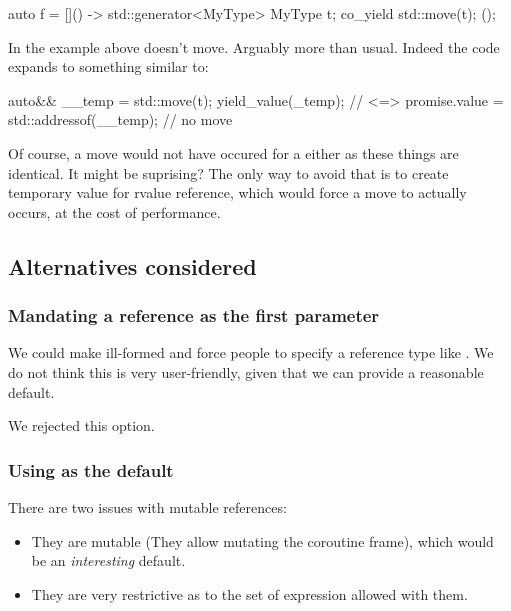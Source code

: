 \documentclass{wg21}
\begin{document}
\begin{colorblock}
auto f = []() -> std::generator<MyType> {
    MyType t;
    co_yield std::move(t);
}();
\end{colorblock}

In the example above  doesn't move. Arguably more than usual.
Indeed the code expands to something similar to:

\begin{colorblock}

auto&& __temp = std::move(t);
yield_value(_temp); // <=> promise.value = std::addressof(__temp); // no move

\end{colorblock}

Of course, a move would not have occured for a  either as these things are identical.
It might be suprising?
The only way to avoid that is to create temporary value for rvalue reference, which would force a move to actually occurs,
at the cost of performance.


\subsection{Alternatives considered}

\subsubsection{Mandating a reference as the first parameter}

We could make  ill-formed and force people to specify a reference type like .
We do not think this is very user-friendly, given that we can provide a reasonable default.

We rejected this option.

\subsubsection{Using  as the default}

There are two issues with mutable references:
\begin{itemize}
\item They are mutable (They allow mutating the coroutine frame), which would be an \emph{interesting} default.
\item They are very restrictive as to the set of  expression allowed with them.
\end{itemize}
\end{document}
